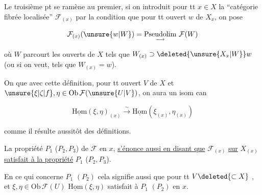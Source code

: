 
Le troisième pt se ramène au premier, si on introduit pour tt $x\in X$ la ``catégorie fibrée localisée'' $\mathcal F_{(x)}$ par la condition que pour tt ouvert   $w$ de $X_x$, on pose

\[
\mathcal F_{(x)}(\unsure{w|W})=\underset{\longrightarrow}{\mathrm{Pseudolim}}\ \mathcal F(W)
\]

où $W$ parcourt les ouverts de $X$ tels que $W_{(x)}\supset\deleted{\unsure{X_x|W}}w$ (ou si on veut, tels que $W_{(x)}=w$). 

On  que avec cette définition, pour tt ouvert $V$ de $X$ et  $\unsure{\xi|\zeta|f},\eta\in\mathrm{Ob}\,\mathcal F(\unsure{U|V})$, on aura  un isom can

\[
\underline{\mathrm{Hom}}(\xi,\eta)_{(x)}\xrightarrow{\sim}
\underline{\mathrm{Hom}}(\xi_{(x)},\eta_{(x)})
\]

comme il résulte aussitôt des définitions.


 La propriété $P_1$ ($P_2,P_3$) de $\mathcal F$ en $x$, \uline{s'énonce aussi en disant que} $\mathcal F_{(x)}$ \uline{sur} $X_{(x)}$ \uline{satisfait à la propriété} $P_1$ ($P_2,P_3$).

En ce qui concerne $P_1$ $(P_2)$ cela signifie aussi que pour tt   $V\deleted{\subset X}$ , et $\xi,\eta\in\mathrm{Ob}\,\mathcal F(U)$ $\underline{\mathrm{Hom}}(\xi,\eta)$ satisfait à $P_1$ $(P_2)$ en $x$.

